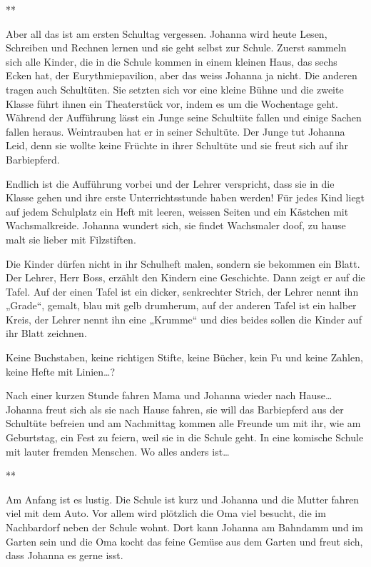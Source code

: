 \documentclass[10pt,titlepage,a5paper]{book}
\newcommand{\sterne}{\par{\centering ***\par}}
\begin{document}
\sterne

Aber all das ist am ersten Schultag vergessen. Johanna wird heute Lesen, Schreiben und Rechnen lernen und sie geht selbst zur Schule.
Zuerst sammeln sich alle Kinder, die in  die Schule kommen in einem kleinen Haus, das sechs Ecken hat, der Eurythmiepavilion, aber das weiss Johanna ja nicht. Die anderen tragen auch Schultüten. Sie setzten sich vor eine kleine Bühne und die zweite Klasse führt ihnen ein Theaterstück vor, indem es um die Wochentage geht. Während der Aufführung lässt ein Junge seine Schultüte fallen und einige Sachen fallen heraus. Weintrauben hat er in seiner Schultüte. Der Junge tut Johanna Leid, denn sie wollte keine Früchte in ihrer Schultüte und sie freut sich auf ihr Barbiepferd.

Endlich ist die Aufführung vorbei und der Lehrer verspricht, dass sie in die Klasse gehen und ihre erste Unterrichtsstunde haben werden! Für jedes Kind liegt auf jedem Schulplatz ein Heft mit leeren, weissen Seiten und ein Kästchen mit Wachsmalkreide. Johanna wundert sich, sie findet Wachsmaler doof, zu hause malt sie lieber mit Filzstiften. 

Die Kinder dürfen nicht in ihr Schulheft malen, sondern sie bekommen ein Blatt. Der Lehrer, Herr Boss, erzählt den Kindern eine Geschichte. Dann zeigt er auf die Tafel. Auf der einen Tafel ist ein dicker, senkrechter Strich, der Lehrer nennt ihn „Grade“, gemalt, blau mit gelb drumherum, auf der anderen Tafel ist ein halber Kreis, der Lehrer nennt ihn eine „Krumme“ und dies beides sollen die Kinder auf ihr Blatt zeichnen.

Keine Buchstaben, keine richtigen Stifte, keine Bücher, kein Fu und keine Zahlen, keine Hefte mit Linien\dots?

Nach einer kurzen Stunde fahren Mama und Johanna wieder nach Hause\dots
Johanna freut sich als sie nach Hause fahren, sie will das Barbiepferd aus der Schultüte befreien und am Nachmittag kommen alle Freunde um mit ihr, wie am Geburtstag, ein Fest zu feiern, weil sie in die Schule geht. In eine komische Schule mit lauter fremden Menschen. Wo alles anders ist\dots


\sterne


Am Anfang ist es lustig. Die Schule ist kurz und Johanna und die Mutter fahren viel mit dem Auto. Vor allem wird plötzlich die Oma viel besucht, die im Nachbardorf neben der Schule wohnt. Dort kann Johanna am Bahndamm und im Garten sein und die Oma kocht das feine Gemüse aus dem Garten und freut sich, dass Johanna es gerne isst.
\end{document}
